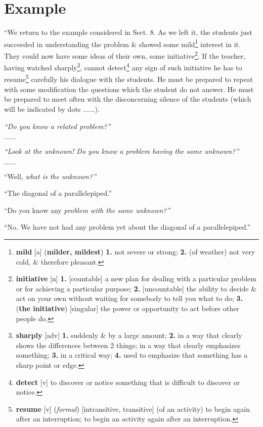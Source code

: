 \documentclass[oneside]{book}
\numberwithin{equation}{section}
\begin{document}
\section{Example}
``We return to the example considered in Sect. 8. As we left it, the students just succeeded in understanding the problem \& showed some mild\footnote{\textbf{mild} [a] (\textbf{milder, mildest}) \textbf{1.} not severe or strong; \textbf{2.} (of weather) not very cold, \& therefore pleasant.} interest in it. They could now have some ideas of their own, some initiative\footnote{\textbf{initiative} [n] \textbf{1.} [countable] a new plan for dealing with a particular problem or for achieving a particular purpose; \textbf{2.} [uncountable] the ability to decide \& act on your own without waiting for somebody to tell you what to do; \textbf{3.} (\textbf{the initiative}) [singular] the power or opportunity to act before other people do.}. If the teacher, having watched sharply\footnote{\textbf{sharply} [adv] \textbf{1.} suddenly \& by a large amount; \textbf{2.} in a way that clearly shows the differences between 2 things; in a way that clearly emphasizes something; \textbf{3.} in a critical way; \textbf{4.} used to emphasize that something has a sharp point or edge.}, cannot detect\footnote{\textbf{detect} [v] to discover or notice something that is difficult to discover or notice.} any sign of such initiative he has to resume\footnote{\textbf{resume} [v] (\textit{formal}) [intransitive, transitive] (of an activity) to begin again after an interruption; to begin an activity again after an interruption.} carefully his dialogue with the students. He must be prepared to repeat with some modification the questions which the student do not answer. He must be prepared to meet often with the disconcerning silence of the students (which will be indicated by dots $\ldots\ldots$).

\textit{``Do you know a related problem?''}

$\ldots\ldots$

\textit{``Look at the unknown! Do you know a problem having the same unknown?''}

$\ldots\ldots$

``Well, \textit{what is the unknown?''}

``The diagonal of a parallelepiped.''

``Do you know any \textit{problem with the same unknown?''}

``No. We have not had any problem yet about the diagonal of a parallelepiped.''
\end{document}
